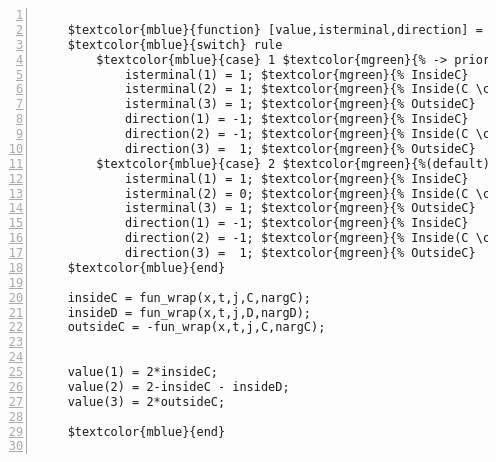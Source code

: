 %  
%  
%  
%  
  
  
\DefineShortVerb[fontfamily=courier,fontseries=m]{\$} 
\DefineShortVerb[fontfamily=courier,fontseries=b]{\#} 
  
\begin{Verbatim}[commandchars=\$\{\},numbers=left,numbersep=2pt] 

    $textcolor{mblue}{function} [value,isterminal,direction] = zeroevents(x,t,j,C,D,rule,nargC,nargD) 
    $textcolor{mblue}{switch} rule 
        $textcolor{mblue}{case} 1 $textcolor{mgreen}{% -> priority for jumps} 
            isterminal(1) = 1; $textcolor{mgreen}{% InsideC} 
            isterminal(2) = 1; $textcolor{mgreen}{% Inside(C \cap D)} 
            isterminal(3) = 1; $textcolor{mgreen}{% OutsideC} 
            direction(1) = -1; $textcolor{mgreen}{% InsideC} 
            direction(2) = -1; $textcolor{mgreen}{% Inside(C \cap D)} 
            direction(3) =  1; $textcolor{mgreen}{% OutsideC} 
        $textcolor{mblue}{case} 2 $textcolor{mgreen}{%(default) -> priority for flows} 
            isterminal(1) = 1; $textcolor{mgreen}{% InsideC} 
            isterminal(2) = 0; $textcolor{mgreen}{% Inside(C \cap D)} 
            isterminal(3) = 1; $textcolor{mgreen}{% OutsideC} 
            direction(1) = -1; $textcolor{mgreen}{% InsideC} 
            direction(2) = -1; $textcolor{mgreen}{% Inside(C \cap D)} 
            direction(3) =  1; $textcolor{mgreen}{% OutsideC} 
    $textcolor{mblue}{end} 
     
    insideC = fun_wrap(x,t,j,C,nargC); 
    insideD = fun_wrap(x,t,j,D,nargD); 
    outsideC = -fun_wrap(x,t,j,C,nargC); 
     
     
    value(1) = 2*insideC; 
    value(2) = 2-insideC - insideD; 
    value(3) = 2*outsideC; 
     
    $textcolor{mblue}{end} 
      
\end{Verbatim}  
  
\UndefineShortVerb{\$} 
\UndefineShortVerb{\#} 
 